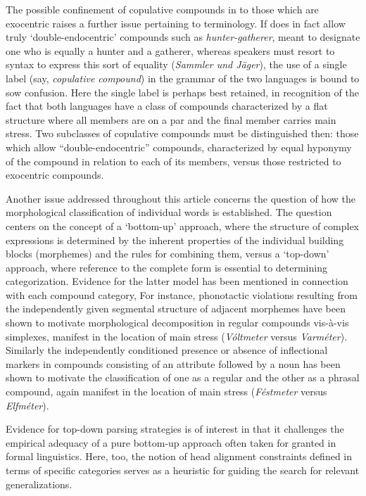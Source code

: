 \documentclass[output=paper
 ,nobabel
 ,draftmode
 ,colorlinks, citecolor=brown
]{langscibook}
\begin{document}
The possible confinement of copulative compounds in  to those which are exocentric raises a
further issue pertaining to terminology. If  does in fact allow truly `double-endocentric'
compounds such as \emph{hunter-gatherer}, meant to designate one who is equally a hunter and a
gatherer, whereas  speakers must resort to syntax to express this sort of equality
(\emph{Sammler und Jäger}), the use of a single label (say, \emph{copulative compound}) in the
grammar of the two languages is bound to sow confusion. Here the single label is perhaps
best retained, in recognition of the fact that both languages have a class of compounds
characterized by a flat structure where all members are on a par and the final member carries main
stress. 
Two subclasses of copulative compounds must be distinguished then: those which allow
``double-endocentric'' compounds, characterized by equal hyponymy of the compound in relation to
each of its members, versus those restricted to exocentric compounds.

Another issue addressed throughout this article concerns the question of how the morphological
classification of individual words is established. The question centers on the concept of a  
`bottom-up' approach, where the structure of complex expressions is determined by the inherent
properties of the individual building blocks (morphemes) and the rules for combining them, versus a  
`top-down' approach, where reference to the complete form is essential to determining
categorization. Evidence for the latter model has been mentioned in connection with each compound
category, For instance, phonotactic violations resulting from the independently given segmental
structure of adjacent morphemes have been shown to motivate morphological decomposition in regular
compounds vis-à-vis simplexes, manifest in the location of main stress (\emph{Vóltmeter} versus
\emph{Varméter}). Similarly the independently conditioned presence or absence of inflectional
markers in compounds consisting of an attribute followed by a noun has been shown to motivate the
classification of one as a regular and the other as a phrasal compound, again manifest in the
location of main stress (\emph{Féstmeter} versus \emph{Elfméter}). 

Evidence for top-down parsing strategies is of interest in that it challenges the empirical adequacy of a pure bottom-up approach often taken for granted in formal linguistics. Here, too, the notion of head alignment constraints defined in terms of specific categories serves as a heuristic for guiding the search for relevant generalizations.%
\end{document}
